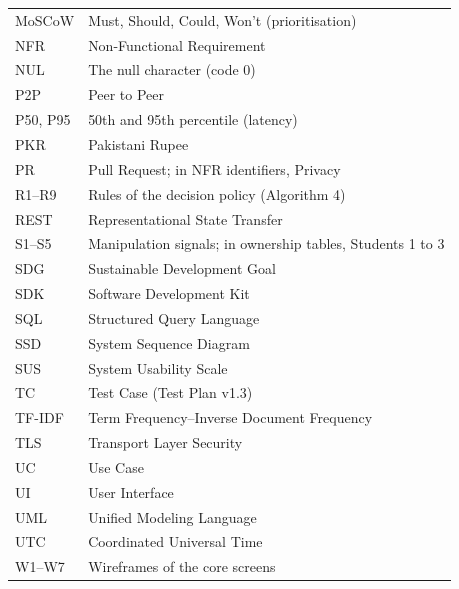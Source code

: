 \begin{longtable}{@{}L{64pt}L{315pt}@{}}
MoSCoW & Must, Should, Could, Won't (prioritisation) \\
NFR & Non-Functional Requirement \\
NUL & The null character (code 0) \\
P2P & Peer to Peer \\
P50, P95 & 50th and 95th percentile (latency) \\
PKR & Pakistani Rupee \\
PR & Pull Request; in NFR identifiers, Privacy \\
R1--R9 & Rules of the decision policy (Algorithm 4) \\
REST & Representational State Transfer \\
S1--S5 & Manipulation signals; in ownership tables, Students 1 to 3 \\
SDG & Sustainable Development Goal \\
SDK & Software Development Kit \\
SQL & Structured Query Language \\
SSD & System Sequence Diagram \\
SUS & System Usability Scale \\
TC & Test Case (Test Plan v1.3) \\
TF-IDF & Term Frequency--Inverse Document Frequency \\
TLS & Transport Layer Security \\
UC & Use Case \\
UI & User Interface \\
UML & Unified Modeling Language \\
UTC & Coordinated Universal Time \\
W1--W7 & Wireframes of the core screens \\
\end{longtable}
